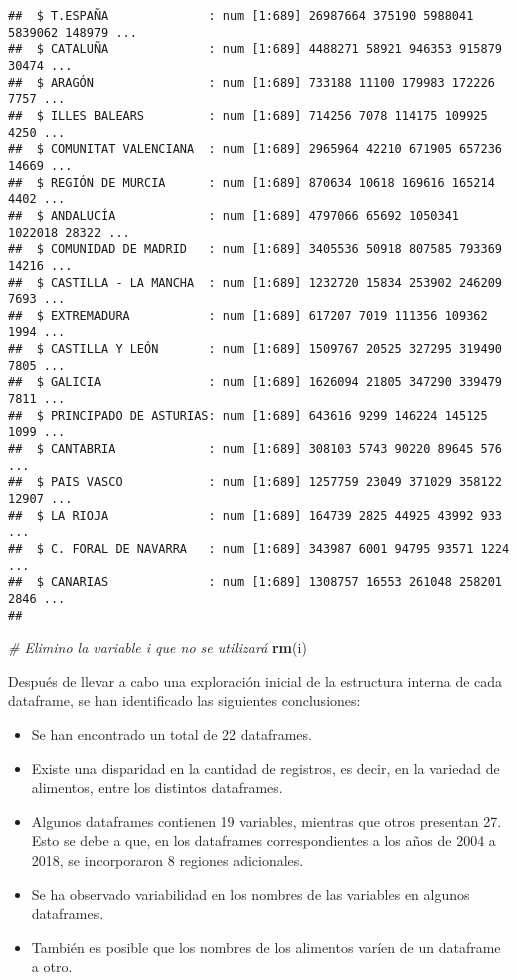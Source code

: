 \documentclass[
]{article}
\newenvironment{Shaded}{\begin{snugshade}}{\end{snugshade}}
\newcommand{\CommentTok}[1]{\textcolor[rgb]{0.56,0.35,0.01}{\textit{#1}}}
\newcommand{\FunctionTok}[1]{\textcolor[rgb]{0.13,0.29,0.53}{\textbf{#1}}}
\newcommand{\NormalTok}[1]{#1}
\begin{document}
\begin{verbatim}
##  $ T.ESPAÑA              : num [1:689] 26987664 375190 5988041 5839062 148979 ...
##  $ CATALUÑA              : num [1:689] 4488271 58921 946353 915879 30474 ...
##  $ ARAGÓN                : num [1:689] 733188 11100 179983 172226 7757 ...
##  $ ILLES BALEARS         : num [1:689] 714256 7078 114175 109925 4250 ...
##  $ COMUNITAT VALENCIANA  : num [1:689] 2965964 42210 671905 657236 14669 ...
##  $ REGIÓN DE MURCIA      : num [1:689] 870634 10618 169616 165214 4402 ...
##  $ ANDALUCÍA             : num [1:689] 4797066 65692 1050341 1022018 28322 ...
##  $ COMUNIDAD DE MADRID   : num [1:689] 3405536 50918 807585 793369 14216 ...
##  $ CASTILLA - LA MANCHA  : num [1:689] 1232720 15834 253902 246209 7693 ...
##  $ EXTREMADURA           : num [1:689] 617207 7019 111356 109362 1994 ...
##  $ CASTILLA Y LEÓN       : num [1:689] 1509767 20525 327295 319490 7805 ...
##  $ GALICIA               : num [1:689] 1626094 21805 347290 339479 7811 ...
##  $ PRINCIPADO DE ASTURIAS: num [1:689] 643616 9299 146224 145125 1099 ...
##  $ CANTABRIA             : num [1:689] 308103 5743 90220 89645 576 ...
##  $ PAIS VASCO            : num [1:689] 1257759 23049 371029 358122 12907 ...
##  $ LA RIOJA              : num [1:689] 164739 2825 44925 43992 933 ...
##  $ C. FORAL DE NAVARRA   : num [1:689] 343987 6001 94795 93571 1224 ...
##  $ CANARIAS              : num [1:689] 1308757 16553 261048 258201 2846 ...
## 
\end{verbatim}

\begin{Shaded}
\begin{Highlighting}[]
\CommentTok{\# Elimino la variable i que no se utilizará}
\FunctionTok{rm}\NormalTok{(i)}
\end{Highlighting}
\end{Shaded}

Después de llevar a cabo una exploración inicial de la estructura
interna de cada dataframe, se han identificado las siguientes
conclusiones:

\begin{itemize}
\item
  Se han encontrado un total de 22 dataframes.
\item
  Existe una disparidad en la cantidad de registros, es decir, en la
  variedad de alimentos, entre los distintos dataframes.
\item
  Algunos dataframes contienen 19 variables, mientras que otros
  presentan 27. Esto se debe a que, en los dataframes correspondientes a
  los años de 2004 a 2018, se incorporaron 8 regiones adicionales.
\item
  Se ha observado variabilidad en los nombres de las variables en
  algunos dataframes.
\item
  También es posible que los nombres de los alimentos varíen de un
  dataframe a otro.
\end{itemize}
\end{document}
